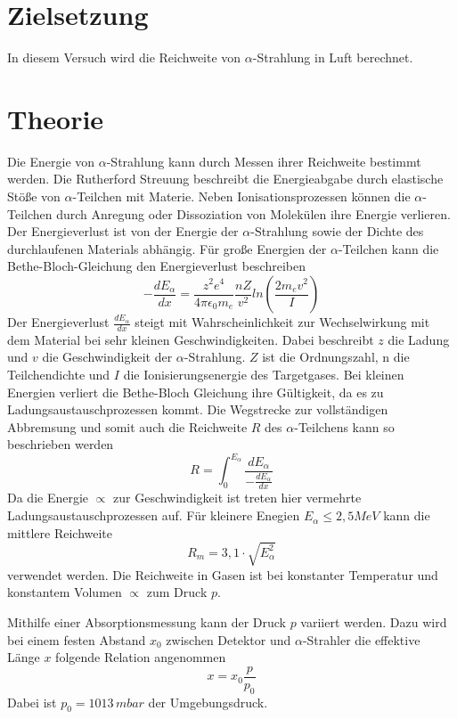 \section{Zielsetzung}
In diesem Versuch wird die Reichweite von $\alpha$-Strahlung in Luft berechnet.
\section{Theorie}
Die Energie von $\alpha$-Strahlung kann durch Messen ihrer Reichweite bestimmt werden.
Die Rutherford Streuung beschreibt die Energieabgabe durch elastische Stöße von
$\alpha$-Teilchen mit Materie.
Neben Ionisationsprozessen können die $\alpha$-Teilchen durch Anregung oder
Dissoziation von Molekülen ihre Energie verlieren.
Der Energieverlust ist von der Energie der $\alpha$-Strahlung sowie der Dichte
des durchlaufenen Materials abhängig.
Für große Energien der $\alpha$-Teilchen kann die Bethe-Bloch-Gleichung
den Energieverlust beschreiben
\begin{equation*}
  -\frac{dE_{\alpha}}{dx} = \frac{z^2 e^4}{4 \pi \epsilon_0 m_e}\frac{nZ}{v^2} ln(\frac{2m_e v^2}{I})
  \label{eq:1}
\end{equation*}
Der Energieverlust $\frac{dE_{\alpha}}{dx}$ steigt mit Wahrscheinlichkeit zur Wechselwirkung mit
dem Material bei sehr kleinen Geschwindigkeiten.
Dabei beschreibt $z$ die Ladung und $v$ die Geschwindigkeit der $\alpha$-Strahlung.
$Z$ ist die Ordnungszahl, n die Teilchendichte und $I$ die Ionisierungsenergie
des Targetgases. Bei kleinen Energien verliert die Bethe-Bloch Gleichung ihre Gültigkeit,
da es zu Ladungsaustauschprozessen kommt.
Die Wegstrecke zur vollständigen Abbremsung
und somit auch die Reichweite $R$ des $\alpha$-Teilchens
kann so beschrieben werden
\begin{equation*}
  R = \int_{0}^{E_{\alpha}} \frac{dE_\alpha}{-\frac{dE_{\alpha}}{dx}}
  \label{eq:2}
\end{equation*}
Da die Energie $\propto $ zur Geschwindigkeit ist treten hier vermehrte Ladungsaustauschprozessen auf.
Für kleinere Enegien $E_\alpha \leq 2,5 MeV$ kann die mittlere Reichweite
\begin{equation}
  R_m= 3,1 \cdot \sqrt{E^2_\alpha}
  \label{eq:3}
\end{equation}
verwendet werden.
Die Reichweite in Gasen ist bei konstanter Temperatur und konstantem Volumen $\propto$ zum Druck $p$.

Mithilfe einer Absorptionsmessung kann der Druck $p$ variiert werden. Dazu
wird bei einem festen Abstand $x_0$ zwischen Detektor und $\alpha$-Strahler die
effektive Länge $x$ folgende Relation angenommen
\begin{equation}
  x = x_0 \frac{p}{p_0}
  \label{eq:4}
\end{equation}
Dabei ist $p_0 = 1013 \, mbar$ der Umgebungsdruck.
